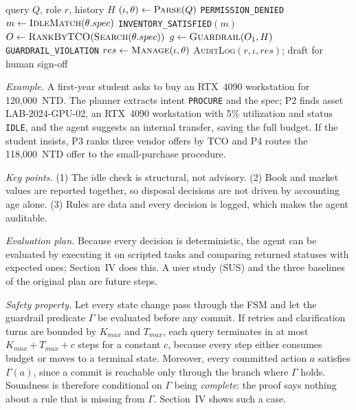 \documentclass[conference]{IEEEtran}
\begin{document}
\begin{algorithm}[t]
\caption{LabSteward main loop}
\label{alg:main}
\begin{algorithmic}[1]
\REQUIRE query $Q$, role $r$, history $H$
\STATE $(\iota,\theta)\leftarrow\textsc{Parse}(Q)$ 
 \RETURN \texttt{PERMISSION\_DENIED} \ENDIF
{}
  \STATE $m\leftarrow\textsc{IdleMatch}(\theta.spec)$
   \RETURN \texttt{INVENTORY\_SATISFIED}$(m)$ \ENDIF
  \STATE $O\leftarrow\textsc{RankByTCO}(\textsc{Search}(\theta.spec))$
  \STATE $g\leftarrow\textsc{Guardrail}(O_1,H)$
   \RETURN \texttt{GUARDRAIL\_VIOLATION} \ENDIF
\ELSE
  \STATE $res\leftarrow\textsc{Manage}(\iota,\theta)$ 
\ENDIF
\STATE \textsc{AuditLog}$(r,\iota,res)$; \RETURN draft for human sign-off
\end{algorithmic}
\end{algorithm}

\textit{Example.} A first-year student asks to buy an RTX~4090
workstation for 120{,}000~NTD. The planner extracts intent
\texttt{PROCURE} and the spec; P2 finds asset LAB-2024-GPU-02, an RTX~4090
workstation with 5\% utilization and status \texttt{IDLE}, and the agent
suggests an internal transfer, saving the full budget. If the student
insists, P3 ranks three vendor offers by TCO and P4 routes the
118{,}000~NTD offer to the small-purchase procedure.

\textit{Key points.} (1) The idle check is structural, not advisory.
(2) Book and market values are reported together, so disposal decisions
are not driven by accounting age alone. (3) Rules are data and every
decision is logged, which makes the agent auditable.

\textit{Evaluation plan.} Because every decision is deterministic, the
agent can be evaluated by executing it on scripted tasks and comparing
returned statuses with expected ones; Section~IV does this. A user study
(SUS) and the three baselines of the original plan are future steps.

\textit{Safety property.} Let every state change pass through the FSM and
let the guardrail predicate $\Gamma$ be evaluated before any commit. If
retries and clarification turns are bounded by $K_{max}$ and $T_{max}$,
each query terminates in at most $K_{max}+T_{max}+c$ steps for a constant
$c$, because every step either consumes budget or moves to a terminal
state. Moreover, every committed action $a$ satisfies $\Gamma(a)$, since a
commit is reachable only through the branch where $\Gamma$ holds.
Soundness is therefore conditional on $\Gamma$ being \emph{complete}:
the proof says nothing about a rule that is missing from $\Gamma$.
Section~IV shows such a case.
\end{document}
